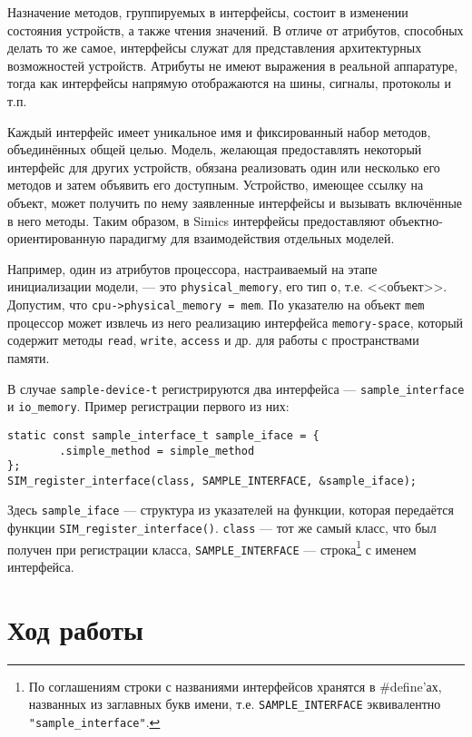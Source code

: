Назначение методов, группируемых в интерфейсы, состоит в изменении состояния устройств, а также чтения значений. В отличе от атрибутов, способных делать то же самое, интерфейсы служат для представления архитектурных возможностей устройств. Атрибуты не имеют выражения в реальной аппаратуре, тогда как интерфейсы напрямую отображаются на шины, сигналы, протоколы и т.п.

Каждый интерфейс имеет уникальное имя и фиксированный набор методов, объединённых общей целью. Модель, желающая предоставлять некоторый интерфейс для других устройств, обязана реализовать один или несколько его методов и затем объявить его доступным. Устройство, имеющее ссылку на объект, может получить по нему заявленные интерфейсы и вызывать включённые в него методы. Таким образом, в Simics интерфейсы предоставляют объектно-ориентированную парадигму для взаимодействия отдельных моделей.

Например, один из атрибутов процессора, настраиваемый на этапе инициализации модели, --- это \texttt{physical_memory}, его тип \texttt{o}, т.е. <<объект>>. Допустим, что \texttt{cpu->physical_memory = mem}. По указателю на объект \texttt{mem} процессор может извлечь из него реализацию интерфейса \texttt{memory-space}, который содержит методы \texttt{read}, \texttt{write}, \texttt{access} и др. для работы с пространствами памяти.

В случае \texttt{sample-device-t} регистрируются два интерфейса --- \texttt{sample_interface}  и \texttt{io_memory}.
Пример регистрации первого из них:
\begin{lstlisting}
static const sample_interface_t sample_iface = {
        .simple_method = simple_method
};
SIM_register_interface(class, SAMPLE_INTERFACE, &sample_iface);
\end{lstlisting}

Здесь \texttt{sample_iface} --- структура из указателей на функции, которая передаётся функции \texttt{SIM_register_interface()}. \texttt{class} --- тот же самый класс, что был получен при регистрации класса, \texttt{SAMPLE_INTERFACE} --- строка\footnote{По соглашениям строки с названиями интерфейсов хранятся в \#define'ах, названных из заглавных букв имени, т.е. \texttt{SAMPLE_INTERFACE} эквивалентно \texttt{"sample_interface"}.} с именем интерфейса.

\section{Ход работы}

